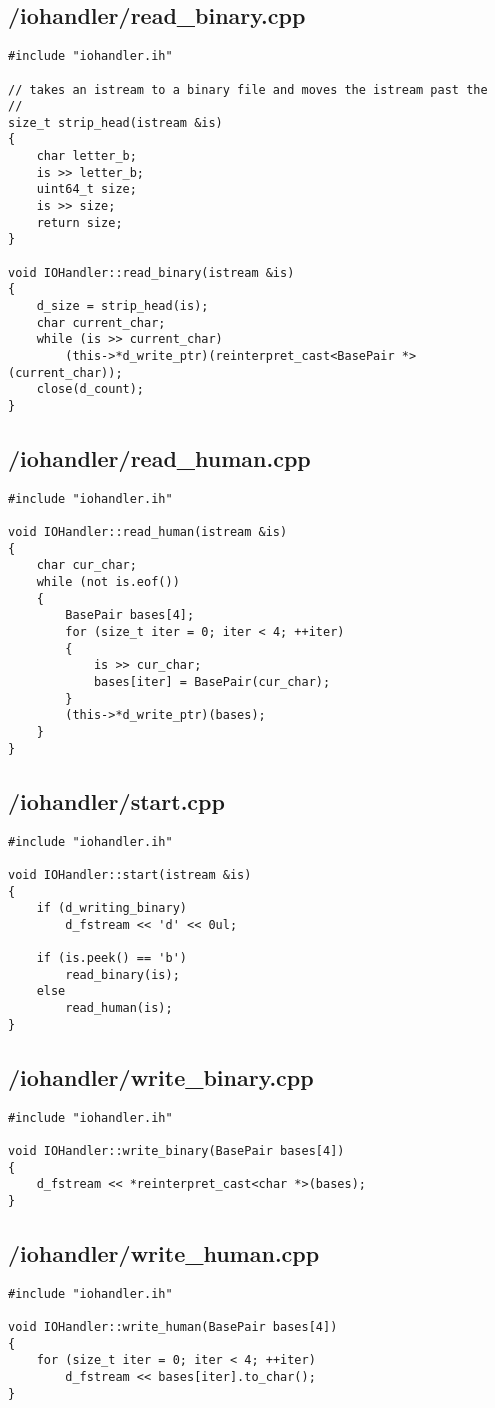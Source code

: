 \documentclass{article}
\begin{document}
\subsection*{/iohandler/read\_binary.cpp}
\begin{verbatim}
#include "iohandler.ih"

// takes an istream to a binary file and moves the istream past the
// 
size_t strip_head(istream &is)
{
    char letter_b;
    is >> letter_b;
    uint64_t size;
    is >> size;
    return size;
}

void IOHandler::read_binary(istream &is)
{
    d_size = strip_head(is);
    char current_char;
    while (is >> current_char)
        (this->*d_write_ptr)(reinterpret_cast<BasePair *>(current_char));
    close(d_count);
}

\end{verbatim}
\subsection*{/iohandler/read\_human.cpp}
\begin{verbatim}
#include "iohandler.ih"

void IOHandler::read_human(istream &is)
{
    char cur_char;
    while (not is.eof())
    {
        BasePair bases[4];
        for (size_t iter = 0; iter < 4; ++iter)
        {
            is >> cur_char;
            bases[iter] = BasePair(cur_char);
        }
        (this->*d_write_ptr)(bases);
    }
}
\end{verbatim}
\subsection*{/iohandler/start.cpp}
\begin{verbatim}
#include "iohandler.ih"

void IOHandler::start(istream &is)
{
    if (d_writing_binary)
        d_fstream << 'd' << 0ul;

    if (is.peek() == 'b')
        read_binary(is);
    else
        read_human(is);
}

\end{verbatim}
\subsection*{/iohandler/write\_binary.cpp}
\begin{verbatim}
#include "iohandler.ih"

void IOHandler::write_binary(BasePair bases[4])
{
    d_fstream << *reinterpret_cast<char *>(bases);
}
\end{verbatim}
\subsection*{/iohandler/write\_human.cpp}
\begin{verbatim}
#include "iohandler.ih"

void IOHandler::write_human(BasePair bases[4])
{
    for (size_t iter = 0; iter < 4; ++iter)
        d_fstream << bases[iter].to_char();
}
\end{verbatim}
\end{document}
